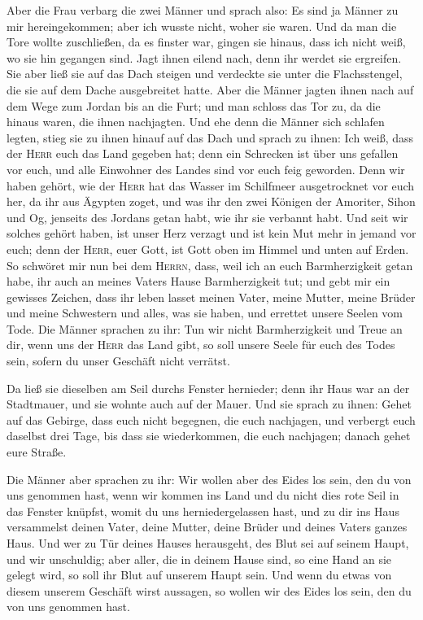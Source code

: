 Aber die Frau verbarg die zwei Männer und sprach also: Es
sind ja Männer zu mir hereingekommen; aber ich wusste nicht, woher sie
waren.  Und da man die Tore wollte zuschließen, da es
finster war, gingen sie hinaus, dass ich nicht weiß, wo sie hin gegangen
sind. Jagt ihnen eilend nach, denn ihr werdet sie ergreifen.
 Sie aber ließ sie auf das Dach steigen und verdeckte sie
unter die Flachsstengel, die sie auf dem Dache ausgebreitet hatte.
 Aber die Männer jagten ihnen nach auf dem Wege zum Jordan
bis an die Furt; und man schloss das Tor zu, da die hinaus waren, die
ihnen nachjagten.  Und ehe denn die Männer sich schlafen
legten, stieg sie zu ihnen hinauf auf das Dach  und sprach
zu ihnen: Ich weiß, dass der \textsc{Herr} euch das Land gegeben hat;
denn ein Schrecken ist über uns gefallen vor euch, und alle Einwohner
des Landes sind vor euch feig geworden.  Denn wir haben
gehört, wie der \textsc{Herr} hat das Wasser im Schilfmeer ausgetrocknet
vor euch her, da ihr aus Ägypten zoget, und was ihr den zwei Königen der
Amoriter, Sihon und Og, jenseits des Jordans getan habt, wie ihr sie
verbannt habt.  Und seit wir solches gehört haben, ist
unser Herz verzagt und ist kein Mut mehr in jemand vor euch; denn der
\textsc{Herr}, euer Gott, ist Gott oben im Himmel und unten auf Erden.
 So schwöret mir nun bei dem \textsc{Herrn}, dass, weil
ich an euch Barmherzigkeit getan habe, ihr auch an meines Vaters Hause
Barmherzigkeit tut; und gebt mir ein gewisses Zeichen, 
dass ihr leben lasset meinen Vater, meine Mutter, meine Brüder und meine
Schwestern und alles, was sie haben, und errettet unsere Seelen vom
Tode.  Die Männer sprachen zu ihr: Tun wir nicht
Barmherzigkeit und Treue an dir, wenn uns der \textsc{Herr} das Land
gibt, so soll unsere Seele für euch des Todes sein, sofern du unser
Geschäft nicht verrätst.

 Da ließ sie dieselben am Seil durchs Fenster hernieder;
denn ihr Haus war an der Stadtmauer, und sie wohnte auch auf der Mauer.
 Und sie sprach zu ihnen: Gehet auf das Gebirge, dass
euch nicht begegnen, die euch nachjagen, und verbergt euch daselbst drei
Tage, bis dass sie wiederkommen, die euch nachjagen; danach gehet eure
Straße.

 Die Männer aber sprachen zu ihr: Wir wollen aber des
Eides los sein, den du von uns genommen hast,  wenn wir
kommen ins Land und du nicht dies rote Seil in das Fenster knüpfst,
womit du uns herniedergelassen hast, und zu dir ins Haus versammelst
deinen Vater, deine Mutter, deine Brüder und deines Vaters ganzes Haus.
 Und wer zu Tür deines Hauses herausgeht, des Blut sei
auf seinem Haupt, und wir unschuldig; aber aller, die in deinem Hause
sind, so eine Hand an sie gelegt wird, so soll ihr Blut auf unserem
Haupt sein.  Und wenn du etwas von diesem unserem
Geschäft wirst aussagen, so wollen wir des Eides los sein, den du von
uns genommen hast.

